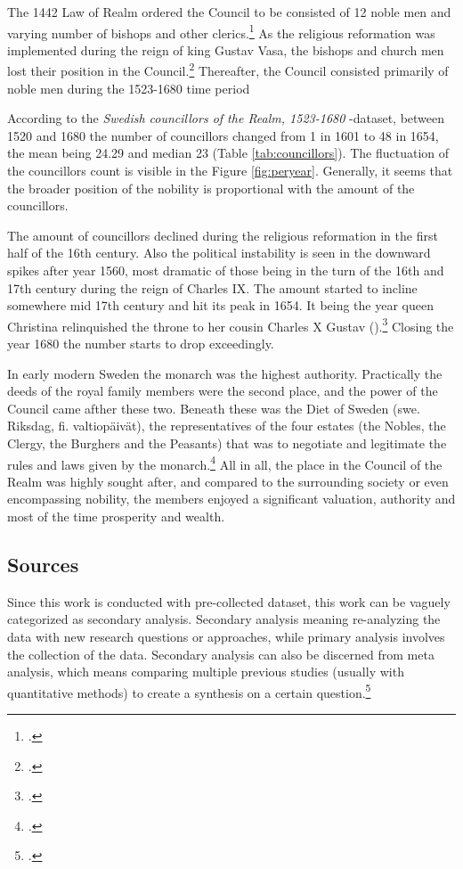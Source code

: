 The 1442 Law of Realm ordered the Council to be consisted of 12 noble men and varying number of bishops and other clerics.\footcite[p. 49.]{HakanenAKoskinen2017} As the religious reformation was implemented during the reign of king Gustav Vasa, the bishops and church men lost their position in the Council.\footcite{TODO} Thereafter, the Council consisted primarily of noble men during the 1523-1680 time period 

According to the \textit{Swedish councillors of the Realm, 1523-1680} -dataset, between 1520 and 1680 the number of councillors changed from 1 in 1601 to 48 in 1654, the mean being 24.29 and median 23 (Table \ref{tab:councillors}). The fluctuation of the councillors count is visible in the Figure \ref{fig:peryear}. Generally, it seems that the broader position of the nobility is proportional with the amount of the councillors. 

The amount of councillors declined during the religious reformation in the first half of the 16th century. Also the political instability is seen in the downward spikes after year 1560, most dramatic of those being in the turn of the 16th and 17th century during the reign of Charles IX. The amount started to incline somewhere mid 17th century and hit its peak in 1654. It being the year queen Christina relinquished the throne to her cousin Charles X Gustav ().\footcite[p. 8-9.]{personalAgency} Closing the year 1680 the number starts to drop exceedingly.

In early modern Sweden the monarch was the highest authority. Practically the deeds of the royal family members were the second place, and the power of the Council came afther these two. Beneath these was the Diet of Sweden (swe. Riksdag, fi. valtiopäivät), the representatives of the four estates (the Nobles, the Clergy, the Burghers and the Peasants) that was to negotiate and legitimate the rules and laws given by the monarch.\footcite[p. 57-61.]{pSuurvalta}  All in all, the place in the Council of the Realm was highly sought after, and compared to the surrounding society or even encompassing nobility, the members enjoyed a significant valuation, authority and most of the time prosperity and wealth. 

\subsection{Sources}
\label{sources}
Since this work is conducted with pre-collected dataset, this work can be vaguely categorized as secondary analysis. Secondary analysis meaning re-analyzing the data with new research questions or approaches, while primary analysis involves the collection of the data. Secondary analysis can also be discerned from meta analysis, which means comparing multiple previous studies (usually with quantitative methods) to create a synthesis on a certain question.\footcite[p. 4-5.]{meta-analysis} 

